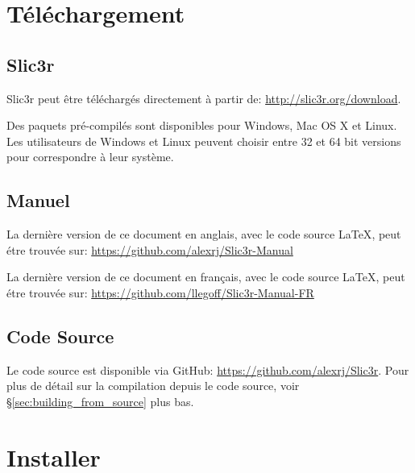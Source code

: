 

\section{T\'el\'echargement}

\subsection{Slic3r} %
\label{sub:slic3r}
Slic3r peut \^etre t\'el\'echarg\'es directement \`a partir de: \url{http://slic3r.org/download}.

Des paquets pr\'e-compil\'es sont disponibles pour Windows, Mac OS X et Linux. Les utilisateurs de Windows et Linux peuvent choisir entre 32 et 64 bit versions pour correspondre \`a leur syst\`eme.

\subsection{Manuel} %
\label{sub:manual}

La derni\`ere version de ce document en anglais, avec le code source {\LaTeX}, peut \'etre trouv\'ee sur: \url{https://github.com/alexrj/Slic3r-Manual}

La derni\`ere version de ce document en fran\c{c}ais, avec le code source {\LaTeX}, peut \'etre trouv\'ee sur: \url{https://github.com/llegoff/Slic3r-Manual-FR}


\subsection{Code Source} %
\label{sub:source}

Le code source est disponible via GitHub: \url{https://github.com/alexrj/Slic3r}. Pour plus de d\'etail sur la compilation depuis le code source, voir §\ref{sec:building_from_source} plus bas.


\section{Installer}

